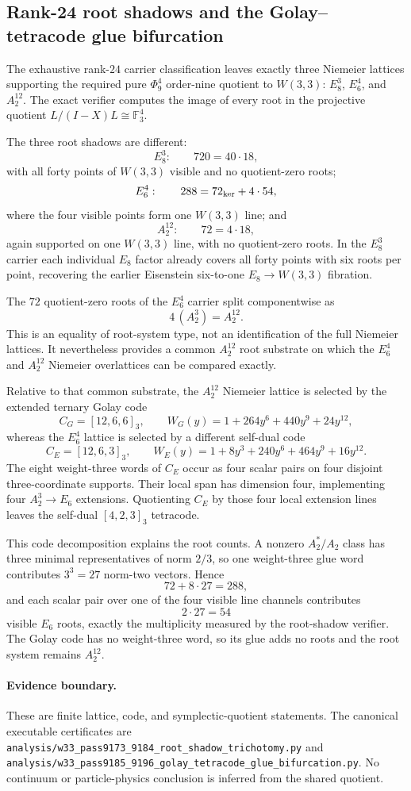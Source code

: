 \subsection*{Rank-24 root shadows and the Golay--tetracode glue bifurcation}

The exhaustive rank-$24$ carrier classification leaves exactly three Niemeier lattices
supporting the required pure $\Phi_9^4$ order-nine quotient to $W(3,3)$:
$E_8^3$, $E_6^4$, and $A_2^{12}$.  The exact verifier computes the image of every
root in the projective quotient $L/(I-X)L\cong\mathbb F_3^4$.

The three root shadows are different:
\[
E_8^3:\qquad 720=40\cdot18,
\]
with all forty points of $W(3,3)$ visible and no quotient-zero roots;
\[
E_6^4:\qquad 288=72_{\rm ker}+4\cdot54,
\]
where the four visible points form one $W(3,3)$ line; and
\[
A_2^{12}:\qquad 72=4\cdot18,
\]
again supported on one $W(3,3)$ line, with no quotient-zero roots.  In the $E_8^3$
carrier each individual $E_8$ factor already covers all forty points with six roots per
point, recovering the earlier Eisenstein six-to-one $E_8\to W(3,3)$ fibration.

The $72$ quotient-zero roots of the $E_6^4$ carrier split componentwise as
\[
4\,(A_2^3)=A_2^{12}.
\]
This is an equality of root-system type, not an identification of the full Niemeier
lattices.  It nevertheless provides a common $A_2^{12}$ root substrate on which the
$E_6^4$ and $A_2^{12}$ Niemeier overlattices can be compared exactly.

Relative to that common substrate, the $A_2^{12}$ Niemeier lattice is selected by the
extended ternary Golay code
\[
C_G=[12,6,6]_3,
\qquad
W_G(y)=1+264y^6+440y^9+24y^{12},
\]
whereas the $E_6^4$ lattice is selected by a different self-dual code
\[
C_E=[12,6,3]_3,
\qquad
W_E(y)=1+8y^3+240y^6+464y^9+16y^{12}.
\]
The eight weight-three words of $C_E$ occur as four scalar pairs on four disjoint
three-coordinate supports.  Their local span has dimension four, implementing four
$A_2^3\to E_6$ extensions.  Quotienting $C_E$ by those four local extension lines leaves
the self-dual $[4,2,3]_3$ tetracode.

This code decomposition explains the root counts.  A nonzero $A_2^*/A_2$ class has three
minimal representatives of norm $2/3$, so one weight-three glue word contributes
$3^3=27$ norm-two vectors.  Hence
\[
72+8\cdot27=288,
\]
and each scalar pair over one of the four visible line channels contributes
\[
2\cdot27=54
\]
visible $E_6$ roots, exactly the multiplicity measured by the root-shadow verifier.
The Golay code has no weight-three word, so its glue adds no roots and the root system
remains $A_2^{12}$.

\paragraph{Evidence boundary.}
These are finite lattice, code, and symplectic-quotient statements.  The canonical executable
certificates are
\texttt{analysis/w33\_pass9173\_9184\_root\_shadow\_trichotomy.py} and
\texttt{analysis/w33\_pass9185\_9196\_golay\_tetracode\_glue\_bifurcation.py}.
No continuum or particle-physics conclusion is inferred from the shared quotient.
